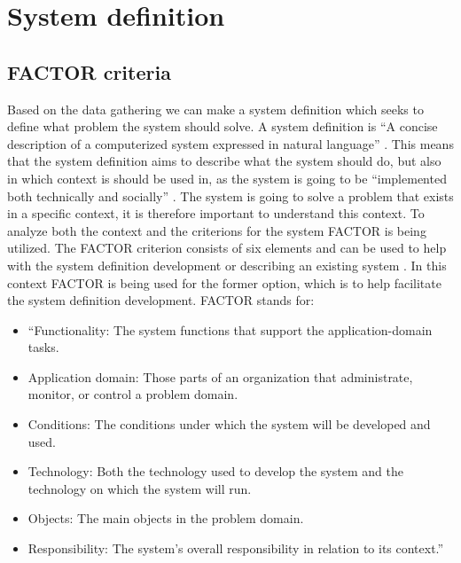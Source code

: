 \chapter{System definition}



\section{FACTOR criteria}

Based on the data gathering we can make a system definition which seeks to define what problem the system should solve. A system definition is “A concise description of a computerized system expressed in natural language” \citep[p.~24]{Rod-Aalborg}. This means that the system definition aims to describe what the system should do, but also in which context is should be used in, as the system is going to be “implemented both technically and socially” \citep[p.~23]{Rod-Aalborg}. The system is going to solve a problem that exists in a specific context, it is therefore important to understand this context.
To analyze both the context and the criterions for the system FACTOR is being utilized. The FACTOR criterion consists of six elements and can be used to help with the system definition development or describing an existing system \cite{Rod-Aalborg}. In this context FACTOR is being used for the former option, which is to help facilitate the system definition development. FACTOR stands for:

\begin{itemize}
\item “Functionality: The system functions that support the application-domain tasks.

\item Application domain: Those parts of an organization that administrate, monitor, or control a problem domain.

\item Conditions: The conditions under which the system will be developed and used.

\item Technology: Both the technology used to develop the system and the technology on which the system will run.

\item Objects: The main objects in the problem domain.

\item Responsibility: The system’s overall responsibility in relation to its context.” \citep[p.~40]{Rod-Aalborg}
\end{itemize}



